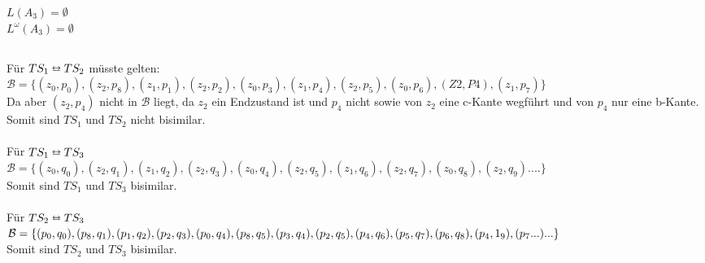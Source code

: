 \documentclass[a4paper,12pt]{scrartcl}
\begin{document}
\subsubsection{}
$L(A_{3}) = \emptyset$\\
$L^\omega(A_{3}) = \emptyset$\\

\subsection{}
\subsubsection{}
Für $TS_1 \leftrightarroweq TS_2$ müsste gelten:\\
$\mathcal{B} = \{(z_0,p_0),(z_2,p_8),(z_1,p_1),(z_2,p_2),(z_0,p_3),(z_1,p_4),(z_2,p_5),(z_0,p_6),(Z2,P4),(z_1,p_7)\}$\\
Da aber $(z_2,p_4)$ nicht in $\mathcal{B}$ liegt, da $z_2$ ein Endzustand ist und $p_4$ nicht sowie von $z_2$ eine c-Kante wegführt und von $p_4$ nur eine b-Kante. Somit sind $TS_1$ und $TS_2$ nicht bisimilar.\\\\
Für $TS_1 \leftrightarroweq TS_3$\\
$\mathcal{B} = \{(z_0,q_0),(z_2,q_1),(z_1,q_2),(z_2,q_3),(z_0,q_4),(z_2,q_5),(z_1,q_6),(z_2,q_7),(z_0,q_8),(z_2,q_9)....\}$\\
Somit sind $TS_1$ und $TS_3$ bisimilar.\\\\
Für $TS_2 \leftrightarroweq TS_3$\\
$\mathcal{B} = \{(p_0,q_0),(p_8,q_1),(p_1,q_2),(p_2,q_3),(p_0,q_4),(p_8,q_5),(p_3,q_4),(p_2,q_5),(p_4,q_6)\\,(p_5,q_7),(p_6,q_8),(p_4,1_9),(p_7...)...\}$\\
Somit sind $TS_2$ und $TS_3$ bisimilar.\\\\
\end{document}
